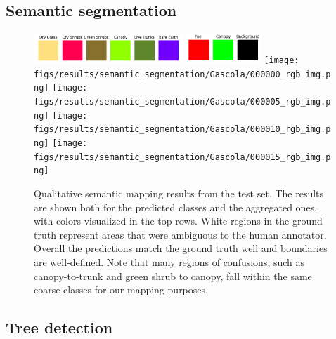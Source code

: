 \subsection{Semantic segmentation}
\begin{figure}[h!]
   \centering
   \includegraphics[width=0.5\textwidth]{figs/results/semantic_segmentation/Gascola/safeforest_all_classes_flat.png}
   \includegraphics[width=0.25\textwidth]{figs/results/semantic_segmentation/Gascola/safeforest_classmap_compressed_flat.png}
   \texttt{[image: figs/results/semantic\_segmentation/Gascola/000000\_rgb\_img.png]}
   \vspace{0pt}
   \texttt{[image: figs/results/semantic\_segmentation/Gascola/000005\_rgb\_img.png]}
   \vspace{0pt}
   \texttt{[image: figs/results/semantic\_segmentation/Gascola/000010\_rgb\_img.png]}
   \vspace{0pt}
   \texttt{[image: figs/results/semantic\_segmentation/Gascola/000015\_rgb\_img.png]}
   \vspace{0pt}
   \caption{
   Qualitative semantic mapping results from the test set. The results are shown both for the predicted classes and the aggregated ones, with colors visualized in the top rows.
   White regions in the ground truth represent areas that were ambiguous to the human annotator. Overall the predictions match the ground truth well and boundaries are well-defined. Note that many regions of confusions, such as canopy-to-trunk and green shrub to canopy, fall within the same coarse classes for our mapping purposes.
   }
   \label{fig:results_semantic_seg_qualitative}                %
\end{figure}
\subsection{Tree detection}

